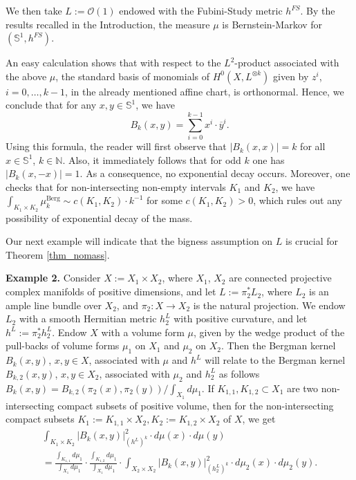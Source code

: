 \documentclass[12pt]{article}
\numberwithin{equation}{section}
\theoremstyle{theorem}
\theoremstyle{definition}
\theoremstyle{remark}
\begin{document}
	We then take $L := \mathscr{O}(1)$ endowed with the Fubini-Study metric $h^{FS}$.
	By the results recalled in the Introduction, the measure $\mu$ is Bernstein-Markov for $(\mathbb{S}^1, h^{FS})$. 
	\par 
	An easy calculation shows that with respect to the $L^2$-product associated with the above $\mu$, the standard basis of monomials of $H^0(X, L^{\otimes k})$ given by $z^i$, $i = 0, \ldots, k - 1$, in the already mentioned affine chart, is orthonormal.
	Hence, we conclude that for any $x, y \in \mathbb{S}^1$, we have
	\begin{equation}
		B_k(x, y) = \sum_{i = 0}^{k - 1} x^i \cdot \overline{y}^i.
	\end{equation}
	Using this formula, the reader will first observe that $|B_k(x, x)| = k$ for all $x \in \mathbb{S}^1$, $k \in \mathbb{N}$. 
	Also, it immediately follows that for odd $k$ one has $|B_k(x, -x)| = 1$. 
	As a consequence, no exponential decay occurs.  
	Moreover, one checks that for non-intersecting non-empty intervals $K_1$ and $K_2$, we have $\int_{K_1 \times K_2} \mu_k^{\mathrm{Berg}} \sim c(K_1, K_2) \cdot k^{-1}$ for some $c(K_1, K_2) > 0$, which rules out any possibility of exponential decay of the mass.
	\par 
	Our next example will indicate that the bigness assumption on $L$ is crucial for Theorem \ref{thm_nomass}.
	\par 
	\textbf{Example 2.}
	Consider $X := X_1 \times X_2$, where $X_1$, $X_2$ are connected projective complex manifolds of positive dimensions, and let $L := \pi_2^* L_2$, where $L_2$ is an ample line bundle over $X_2$, and $\pi_2 : X \to X_2$ is the natural projection.
	We endow $L_2$ with a smooth Hermitian metric $h^L_2$ with positive curvature, and let $h^L := \pi_2^* h^L_2$.
	Endow $X$ with a volume form $\mu$, given by the wedge product of the pull-backs of volume forms $\mu_1$ on $X_1$ and $\mu_2$ on $X_2$.
	Then the Bergman kernel $B_k(x, y)$, $x , y \in X$, associated with $\mu$ and $h^L$ will relate to the Bergman kernel $B_{k, 2}(x, y)$, $x , y \in X_2$, associated with $\mu_2$ and $h^L_2$ as follows $B_k(x, y) = B_{k, 2}(\pi_2(x), \pi_2(y)) / \int_{X_1} d \mu_1$.
	If $K_{1, 1}, K_{1, 2} \subset X_1$ are two non-intersecting compact subsets of positive volume, then for the non-intersecting compact subsets $K_1 := K_{1, 1} \times X_2, K_2 := K_{1, 2} \times X_2$ of $X$, we get 
	\begin{multline}
		\int_{K_1 \times K_2} |B_k(x, y)|^2_{(h^L)^k} \cdot d \mu(x) \cdot d \mu (y)
		\\
		=
	 	\frac{\int_{K_{1, 1}} d \mu_1}{\int_{X_1} d \mu_1}
	 	\cdot
	 	\frac{\int_{K_{1, 2}} d \mu_1}{\int_{X_1} d \mu_1}
	 	\cdot
	 	\int_{X_2 \times X_2} |B_k(x, y)|^2_{(h^L_2)^k} \cdot d \mu_2 (x) \cdot d \mu_2 (y).
	\end{multline}
\end{document}
